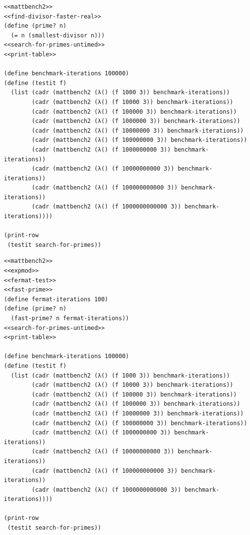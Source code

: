 \documentclass[final,fleqn,titlepage]{article}
\begin{document}
\begin{verbatim}
<<mattbench2>>
<<find-divisor-faster-real>>
(define (prime? n)
  (= n (smallest-divisor n)))
<<search-for-primes-untimed>>
<<print-table>>

(define benchmark-iterations 100000)
(define (testit f)
  (list (cadr (mattbench2 (λ() (f 1000 3)) benchmark-iterations))
        (cadr (mattbench2 (λ() (f 10000 3)) benchmark-iterations))
        (cadr (mattbench2 (λ() (f 100000 3)) benchmark-iterations))
        (cadr (mattbench2 (λ() (f 1000000 3)) benchmark-iterations))
        (cadr (mattbench2 (λ() (f 10000000 3)) benchmark-iterations))
        (cadr (mattbench2 (λ() (f 100000000 3)) benchmark-iterations))
        (cadr (mattbench2 (λ() (f 1000000000 3)) benchmark-iterations))
        (cadr (mattbench2 (λ() (f 10000000000 3)) benchmark-iterations))
        (cadr (mattbench2 (λ() (f 100000000000 3)) benchmark-iterations))
        (cadr (mattbench2 (λ() (f 1000000000000 3)) benchmark-iterations))))

(print-row
 (testit search-for-primes))
\end{verbatim}

\begin{verbatim}
<<mattbench2>>
<<expmod>>
<<fermat-test>>
<<fast-prime>>
(define fermat-iterations 100)
(define (prime? n)
  (fast-prime? n fermat-iterations))
<<search-for-primes-untimed>>
<<print-table>>

(define benchmark-iterations 100000)
(define (testit f)
  (list (cadr (mattbench2 (λ() (f 1000 3)) benchmark-iterations))
        (cadr (mattbench2 (λ() (f 10000 3)) benchmark-iterations))
        (cadr (mattbench2 (λ() (f 100000 3)) benchmark-iterations))
        (cadr (mattbench2 (λ() (f 1000000 3)) benchmark-iterations))
        (cadr (mattbench2 (λ() (f 10000000 3)) benchmark-iterations))
        (cadr (mattbench2 (λ() (f 100000000 3)) benchmark-iterations))
        (cadr (mattbench2 (λ() (f 1000000000 3)) benchmark-iterations))
        (cadr (mattbench2 (λ() (f 10000000000 3)) benchmark-iterations))
        (cadr (mattbench2 (λ() (f 100000000000 3)) benchmark-iterations))
        (cadr (mattbench2 (λ() (f 1000000000000 3)) benchmark-iterations))))

(print-row
 (testit search-for-primes))
\end{verbatim}
\end{document}
